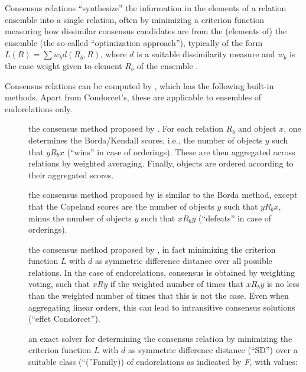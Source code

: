 \documentclass[fleqn]{article}
\newcommand{\dQuote}[1]{``{#1}''}
\newcommand{\var}[1]{\textit{#1}}
\newcommand{\codefun}[1]{\code{#1()}}
\newcommand{\codefunind}[1]{\codefun{#1}\index{\texttt{#1}}}
\begin{document}
Consensus relations \dQuote{synthesize} the information in the
elements of a relation ensemble into a single relation, often by
minimizing a criterion function measuring how dissimilar consensus
candidates are from the (elements of) the ensemble (the so-called
\dQuote{optimization approach}), typically of the form
$L(R) = \sum w_b d(R_b, R)$, where $d$ is a suitable
dissimilarity measure  and
$w_b$ is the case weight given to element $R_b$ of the
ensemble \cite[such consensus relations are called \dQuote{central
  relations} in][]{ranking:Regnier:1965}.

Consensus relations can be computed by \codefunind{relation\_consensus},
which has the following built-in methods.  Apart from Condorcet's, these
are applicable to ensembles of endorelations only.
\begin{description}
 \item[] the consensus method proposed by
  \cite{ranking:Borda:1781}.  For each relation $R_b$ and object $x$,
  one determines the Borda/Kendall scores, i.e., the number of objects
  $y$ such that $y R_b x$ (\dQuote{wins} in case of orderings).
  These are then aggregated across relations
  by weighted averaging.  Finally, objects are ordered according to
  their aggregated scores.
 \item[] the consensus method proposed by
  \cite{ranking:Copeland:1951} is similar to the Borda method, except
  that the Copeland scores are the number of objects
  $y$ such that $y R_b x$, minus the number of objects
  $y$ such that $x R_b y$ (\dQuote{defeats} in case of orderings).
 \item[] the consensus method proposed by
  \cite{ranking:Condorcet:1785}, in fact minimizing the criterion
  function $L$ with $d$ as symmetric difference distance over all
  possible relations.  In the case of endorelations, consensus is
  obtained by weighting voting, such that $x R y$ if the weighted number
  of times that $x R_b y$ is no less than the weighted number of times
  that this is not the case.  Even when aggregating linear orders, this
  can lead to intransitive consensus solutions (\dQuote{effet
    Condorcet}).
 \item[\code{"SD/\var{F}"}]an exact solver for determining the
    consensus relation by minimizing the criterion function $L$ with $d$
    as symmetric difference distance (\dQuote{SD}) over a suitable
    class (\dQuote(Family)) of endorelations as
    indicated by \var{F}, with values:
    \begin{description}

\end{description}
\end{description}
\end{document}
